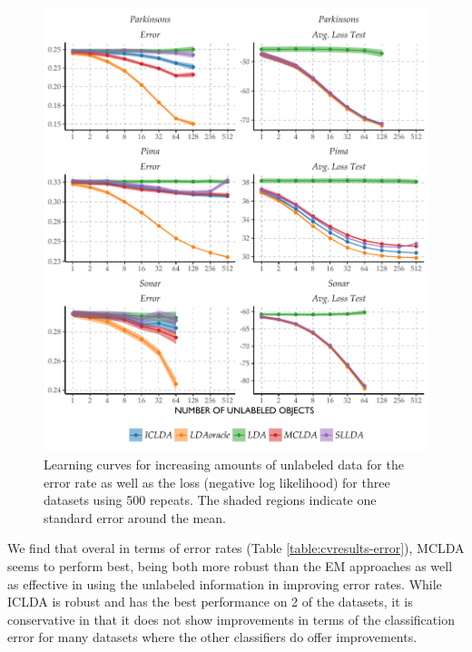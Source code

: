\documentclass[twoside]{memoir}\usepackage[]{graphicx}\usepackage{xcolor}
\makeatletter
\def\maxwidth{ %
  \ifdim\Gin@nat@width>\linewidth
    \linewidth
  \else
    \Gin@nat@width
  \fi
}
\newenvironment{knitrout}{}{} %
\makeatother
\begin{document}
\begin{knitrout}
\color{fgcolor}\begin{figure}
\includegraphics[width=\maxwidth]{figure/errorcurves-1} \caption[Learning curves for increasing amounts of unlabeled data for the error rate as well as the loss (negative log likelihood) for three datasets using 500 repeats]{Learning curves for increasing amounts of unlabeled data for the error rate as well as the loss (negative log likelihood) for three datasets using 500 repeats. The shaded regions indicate one standard error around the mean.}\label{fig:errorcurves}
\end{figure}


\end{knitrout}

We find that overal in terms of error rates (Table \ref{table:cvresults-error}), MCLDA seems to perform best, being both more robust than the EM approaches as well as effective in using the unlabeled information in improving error rates. While ICLDA is robust and has the best performance on 2 of the datasets, it is conservative in that it does not show improvements in terms of the classification error for many datasets where the other classifiers do offer improvements.
\end{document}
